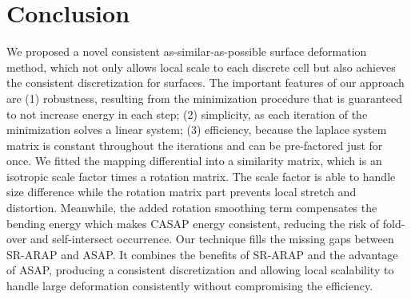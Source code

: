 \section{Conclusion}
We proposed a novel consistent as-similar-as-possible surface deformation method, which not only allows local scale to each discrete cell but also achieves the consistent discretization for surfaces. The important features of our approach are (1) robustness, resulting from the minimization procedure that is guaranteed to not increase energy in each step; (2) simplicity, as each iteration of the minimization solves a linear system; (3) efficiency, because the laplace system matrix is constant throughout the iterations and can be pre-factored just for once. We fitted the mapping differential into a similarity matrix, which is an isotropic scale factor times a rotation matrix. The scale factor is able to handle size difference while the rotation matrix part prevents local stretch and distortion. Meanwhile, the added rotation smoothing term compensates the bending energy which makes CASAP energy consistent, reducing the risk of fold-over and self-intersect occurrence. Our technique fills the missing gaps between SR-ARAP and ASAP. It combines the benefits of SR-ARAP and the advantage of ASAP, producing a consistent discretization and allowing local scalability to handle large deformation consistently without compromising the efficiency.




\ifx\isEmbedded\undefined
\pagebreak

\fi
